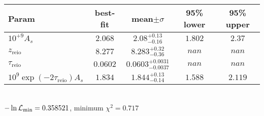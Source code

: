 \begin{tabular}{|l|c|c|c|c|} 
 \hline 
Param & best-fit & mean$\pm\sigma$ & 95\% lower & 95\% upper \\ \hline 
$10^{+9}A_{s }$ &$2.068$ & $2.08_{-0.16}^{+0.13}$ & $1.802$ & $2.37$ \\ 
$z_\mathrm{reio}$ &$8.277$ & $8.283_{-0.36}^{+0.32}$ & $nan$ & $nan$ \\ 
$\tau_\mathrm{reio}$ &$0.0602$ & $0.0603_{-0.0037}^{+0.0031}$ & $nan$ & $nan$ \\ 
$10^9 \exp(-2 \tau_\mathrm{reio}) A_s$ &$1.834$ & $1.844_{-0.14}^{+0.13}$ & $1.588$ & $2.119$ \\ 
\hline 
 \end{tabular} \\ 
$-\ln{\cal L}_\mathrm{min} =0.358521$, minimum $\chi^2=0.717$ \\ 

